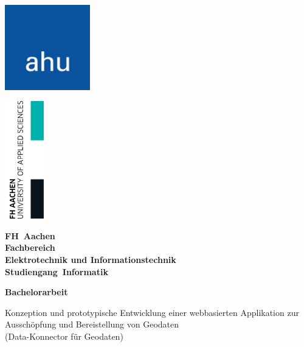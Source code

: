\documentclass[a4paper,12pt]{scrreprt}
\begin{document}
\begin{titlepage}
	\thispagestyle{empty}

    \noindent
    \begin{minipage}[t]{0.5\textwidth}
        \includegraphics[width=3.7cm]{firmenlogo.jpg}
    \end{minipage}%
    \begin{minipage}[t]{0.5\textwidth}
          \raggedleft
          \includegraphics[width=1.7cm]{FHAC.jpg}
    \end{minipage}

	\vspace{1.0cm}

	{\centering \bfseries \Large FH~Aachen \\
	\vspace{1cm}
	\normalsize Fachbereich\\
	Elektrotechnik und Informationstechnik \\
	Studiengang~Informatik \par}

	\vspace{1cm}
    
	{\centering \bfseries \large Bachelorarbeit \par}

	\vspace{1cm}

	\centering \begin{minipage}[t]{13cm}
		\centering \small Konzeption und prototypische Entwicklung einer webbasierten Applikation zur Ausschöpfung und Bereistellung von Geodaten \\
        (Data-Konnector für Geodaten)
		\medskip
	\end{minipage}


\end{titlepage}
\end{document}
